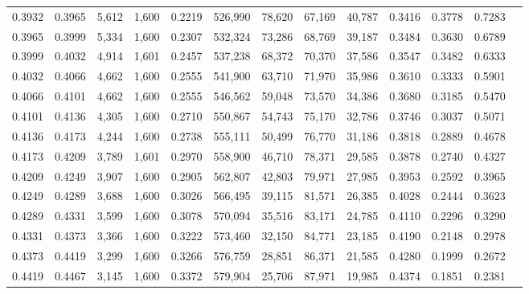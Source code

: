 \begin{tabular}{rrrrrrrrrrrrr}
0.3932 & 0.3965 &  5,612 & 1,600 &                                     0.2219 & 526,990 &  78,620 &  67,169 &  40,787 & 0.3416 & 0.3778 & 0.7283 \\
0.3965 & 0.3999 &  5,334 & 1,600 &                                     0.2307 & 532,324 &  73,286 &  68,769 &  39,187 & 0.3484 & 0.3630 & 0.6789 \\
0.3999 & 0.4032 &  4,914 & 1,601 &                                     0.2457 & 537,238 &  68,372 &  70,370 &  37,586 & 0.3547 & 0.3482 & 0.6333 \\
0.4032 & 0.4066 &  4,662 & 1,600 &                                     0.2555 & 541,900 &  63,710 &  71,970 &  35,986 & 0.3610 & 0.3333 & 0.5901 \\
0.4066 & 0.4101 &  4,662 & 1,600 &                                     0.2555 & 546,562 &  59,048 &  73,570 &  34,386 & 0.3680 & 0.3185 & 0.5470 \\
0.4101 & 0.4136 &  4,305 & 1,600 &                                     0.2710 & 550,867 &  54,743 &  75,170 &  32,786 & 0.3746 & 0.3037 & 0.5071 \\
0.4136 & 0.4173 &  4,244 & 1,600 &                                     0.2738 & 555,111 &  50,499 &  76,770 &  31,186 & 0.3818 & 0.2889 & 0.4678 \\
0.4173 & 0.4209 &  3,789 & 1,601 &                                     0.2970 & 558,900 &  46,710 &  78,371 &  29,585 & 0.3878 & 0.2740 & 0.4327 \\
0.4209 & 0.4249 &  3,907 & 1,600 &                                     0.2905 & 562,807 &  42,803 &  79,971 &  27,985 & 0.3953 & 0.2592 & 0.3965 \\
0.4249 & 0.4289 &  3,688 & 1,600 &                                     0.3026 & 566,495 &  39,115 &  81,571 &  26,385 & 0.4028 & 0.2444 & 0.3623 \\
0.4289 & 0.4331 &  3,599 & 1,600 &                                     0.3078 & 570,094 &  35,516 &  83,171 &  24,785 & 0.4110 & 0.2296 & 0.3290 \\
0.4331 & 0.4373 &  3,366 & 1,600 &                                     0.3222 & 573,460 &  32,150 &  84,771 &  23,185 & 0.4190 & 0.2148 & 0.2978 \\
0.4373 & 0.4419 &  3,299 & 1,600 &                                     0.3266 & 576,759 &  28,851 &  86,371 &  21,585 & 0.4280 & 0.1999 & 0.2672 \\
0.4419 & 0.4467 &  3,145 & 1,600 &                                     0.3372 & 579,904 &  25,706 &  87,971 &  19,985 & 0.4374 & 0.1851 & 0.2381 \\

\end{tabular}
